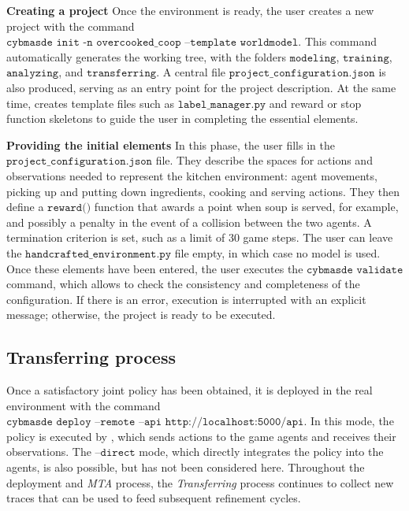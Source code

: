 \noindent
\textbf{Creating a project} \quad
Once the environment is ready, the user creates a new project with the command $\texttt{cybmasde init -n overcooked\_coop --template worldmodel}$. This command automatically generates the working tree, with the folders $\texttt{modeling}$, $\texttt{training}$, $\texttt{analyzing}$, and $\texttt{transferring}$. A central file $\texttt{project\_configuration.json}$ is also produced, serving as an entry point for the project description. At the same time,  creates template files such as $\texttt{label\_manager.py}$ and reward or stop function skeletons to guide the user in completing the essential elements.

\noindent
\textbf{Providing the initial elements} \quad
In this phase, the user fills in the $\texttt{project\_configuration.json}$ file. They describe the spaces for actions and observations needed to represent the kitchen environment: agent movements, picking up and putting down ingredients, cooking and serving actions. They then define a $\texttt{reward()}$ function that awards a point when soup is served, for example, and possibly a penalty in the event of a collision between the two agents. A termination criterion is set, such as a limit of 30 game steps. The user can leave the $\texttt{handcrafted\_environment.py}$ file empty, in which case no  model is used. Once these elements have been entered, the user executes the $\texttt{cybmasde validate}$ command, which allows  to check the consistency and completeness of the configuration. If there is an error, execution is interrupted with an explicit message; otherwise, the project is ready to be executed.

\subsection{Transferring process}
Once a satisfactory joint policy has been obtained, it is deployed in the real environment with the command $\texttt{cybmasde deploy --remote --api http://localhost:5000/api}$. In this mode, the policy is executed by , which sends actions to the game agents and receives their observations. The $\texttt{--direct}$ mode, which directly integrates the policy into the agents, is also possible, but has not been considered here. Throughout the deployment and \textit{MTA} process, the \textit{Transferring} process continues to collect new traces that can be used to feed subsequent refinement cycles.

